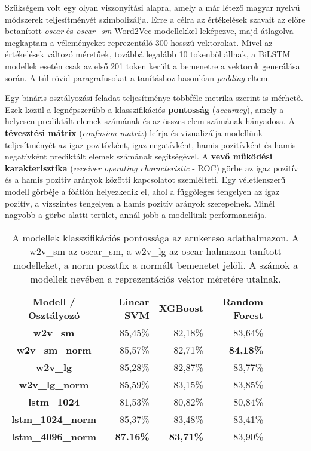 Szükségem volt egy olyan viszonyítási alapra, amely a már létező magyar nyelvű módszerek teljesítményét szimbolizálja. Erre a célra az értékelések szavait az előre betanított \textit{oscar} és \textit{oscar\_sm} Word2Vec modellekkel leképezve, majd átlagolva megkaptam a véleményeket reprezentáló 300 hosszú vektorokat. Mivel az értékelések változó méretűek, továbbá legalább 10 tokenből állnak, a BiLSTM modellek esetén csak az első 201 token került a bemenetre a vektorok generálása során. A túl rövid paragrafusokat a tanításhoz hasonlóan \textit{padding}-eltem.

Egy bináris osztályozási feladat teljesítménye többféle metrika szerint is mérhető. Ezek közül a legnépszerűbb a klasszifikációs \textbf{pontosság} (\textit{accuracy}), amely a helyesen prediktált elemek számának és az összes elem számának hányadosa. A \textbf{tévesztési mátrix} (\textit{confusion matrix}) leírja és vizualizálja modellünk teljesítményét az igaz pozitívként, igaz negatívként, hamis pozitívként és hamis negatívként prediktált elemek számának segítségével. A \textbf{vevő működési karakterisztika} (\textit{receiver operating characteristic} - ROC) görbe az igaz pozitív és a hamis pozitív arányok közötti kapcsolatot szemlélteti. Egy véletlenszerű modell görbéje a főátlón helyezkedik el, ahol a függőleges tengelyen az igaz pozitív, a vízszintes tengelyen a hamis pozitív arányok szerepelnek. Minél nagyobb a görbe alatti terület, annál jobb a modellünk performanciája.

\begin{table}[H]
	\centering
	\begin{tabular}{ | c | r | r | r | r | r | r | r |}
		\hline
		\multirow{2}{*}{\textbf{Modell / Osztályozó}} & \multirow{2}{*}{\textbf{Linear SVM}} & \multirow{2}{*}{\textbf{XGBoost}} & \multirow{2}{*}{\textbf{Random Forest}} \\
		& & & \\
		\hline \hline		
		\textbf{w2v\_sm} & 85,45\% & 82,18\% & 83,64\% \\
		\hline
		\textbf{w2v\_sm\_norm} & 85,57\% & 82,71\% & \textbf{84,18\%} \\
		\hline
		\textbf{w2v\_lg} & 85,28\% & 82,87\% & 83,77\% \\
		\hline
		\textbf{w2v\_lg\_norm} & 85,59\% & 83,15\% & 83,85\% \\
		\hline  
		\textbf{lstm\_1024} & 81,53\% & 80,82\% & 80,84\% \\
		\hline  
		\textbf{lstm\_1024\_norm} & 85,37\% & 83,48\% & 83,41\% \\
		\hline
		\textbf{lstm\_4096\_norm} & \textbf{87.16\%} & \textbf{83,71\%} & 83,90\% \\
		\hline
	\end{tabular}
	\caption[A modellek pontossága]{A modellek klasszifikációs pontossága az arukereso adathalmazon. A w2v\_sm az oscar\_sm, a w2v\_lg az oscar halmazon tanított modelleket, a norm posztfix a normált bemenetet jelöli. A számok a modellek nevében a reprezentációs vektor méretére utalnak.}
	\label{tab:evaluation}
\end{table}

